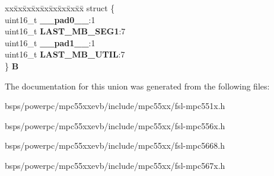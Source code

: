 \begin{DoxyCompactItemize}
\begin{tabbing}
\end{tabbing}\item 
\mbox{\label{unionuMBSSUTR_a135a19a633b8ede60e6c42a76a1edc9b}} 
\begin{tabbing}
xx\=xx\=xx\=xx\=xx\=xx\=xx\=xx\=xx\=\kill
struct \{\\
\>uint16\_t {\bfseries \_\_pad0\_\_}:1\\
\>uint16\_t {\bfseries LAST\_MB\_SEG1}:7\\
\>uint16\_t {\bfseries \_\_pad1\_\_}:1\\
\>uint16\_t {\bfseries LAST\_MB\_UTIL}:7\\
\} {\bfseries B}\\

\end{tabbing}\end{DoxyCompactItemize}


The documentation for this union was generated from the following files\+:\begin{DoxyCompactItemize}
\item 
bsps/powerpc/mpc55xxevb/include/mpc55xx/fsl-\/mpc551x.\+h\item 
bsps/powerpc/mpc55xxevb/include/mpc55xx/fsl-\/mpc556x.\+h\item 
bsps/powerpc/mpc55xxevb/include/mpc55xx/fsl-\/mpc5668.\+h\item 
bsps/powerpc/mpc55xxevb/include/mpc55xx/fsl-\/mpc567x.\+h\end{DoxyCompactItemize}
